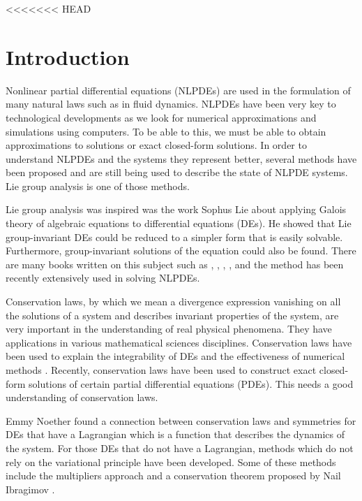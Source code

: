 <<<<<<< HEAD
\chapter{Introduction \label{ch1}}
Nonlinear partial differential equations (NLPDEs) are used in the formulation of many natural laws such as in fluid dynamics. NLPDEs have been very key to technological developments as we look for numerical approximations and simulations using computers. To be able to this, we must be able to obtain approximations to solutions or exact closed-form solutions. In order to understand NLPDEs and the systems they represent better, several methods have been proposed and are still being used to describe the state of NLPDE systems. Lie group analysis is one of those methods.

Lie group analysis was inspired was the work Sophus Lie \citep{lie1891vorlesungen}  about applying Galois theory of algebraic equations to differential equations (DEs). He showed that Lie group-invariant DEs could be reduced to a simpler form that is easily solvable. Furthermore, group-invariant solutions of the equation could also be found. There are many books written on this subject such as  \citep{ovsyannikov2013lectures}, \citep{olver2000applications}, \citep{bluman2013symmetries}, \citep{ibragimov}, \citep{ibragimov2009practical} and the method has been recently extensively used in solving NLPDEs.

Conservation laws, by which we mean a divergence expression vanishing on all the solutions of a system and describes invariant properties of the system, are very important in the understanding of real physical phenomena. They have applications in various mathematical sciences disciplines. Conservation laws have been used to explain the integrability of DEs and the effectiveness of numerical methods \citep{leveque1992numerical}. Recently,  conservation laws have been used to construct exact closed-form solutions of certain partial differential equations (PDEs). This needs a good understanding of conservation laws.

Emmy Noether  \citep{noether1918konig} found a connection between conservation laws and symmetries for DEs that have a Lagrangian which is a function that describes the dynamics of the system. For those DEs that do not have a Lagrangian, methods which do not rely on the variational principle have been developed. Some of these methods include the multipliers approach and a conservation theorem proposed by Nail Ibragimov \citep{ibragimov2007new}.

